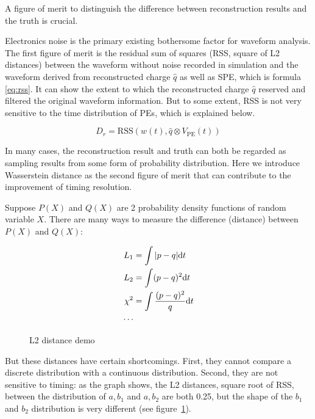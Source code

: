A figure of merit to distinguish the difference between reconstruction results and the truth is crucial. 

Electronics noise is the primary existing bothersome factor for waveform analysis. The first figure of merit is the residual sum of squares (RSS, square of L2 distances) between the waveform without noise recorded in simulation and the waveform derived from reconstructed charge $\hat{q}$ as well as SPE, which is formula \eqref{eq:rss}. It can show the extent to which the reconstructed charge $\hat{q}$ reserved and filtered the original waveform information. But to some extent, RSS is not very sensitive to the time distribution of PEs, which is explained below. 

\begin{equation}
    D_r = \mathrm{RSS}(w(t), \hat{q} \otimes V_\mathrm{PE}(t)) \label{eq:rss}
\end{equation}

In many cases, the reconstruction result and truth can both be regarded as sampling results from some form of probability distribution. Here we introduce Wasserstein distance as the second figure of merit that can contribute to the improvement of timing resolution. 

Suppose $P(X)$ and $Q(X)$ are 2 probability density functions of random variable $X$. There are many ways to measure the difference (distance) between $P(X)$ and $Q(X)$: 

\begin{minipage}{.3\textwidth}
\begin{align*}
    L_{1} &= \int|p-q| \mathrm{d} t \\
    L_{2} &= \int(p-q)^{2} \mathrm{d} t \\
    \chi^{2} &= \int\frac{(p-q)^{2}}{q} \mathrm{d} t \\
    \cdots
\end{align*}
\end{minipage}
\begin{minipage}{.7\textwidth}
\begin{figure}[H]
    \centering
    \scalebox{0.4}{}
    \caption{\label{fig:l2} L2 distance demo}
\end{figure}
\end{minipage}

But these distances have certain shortcomings. First, they cannot compare a discrete distribution with a continuous distribution. Second, they are not sensitive to timing: as the graph shows, the L2 distances, square root of RSS, between the distribution of $a,b_{1}$ and $a,b_{2}$ are both 0.25, but the shape of the $b_{1}$ and $b_{2}$ distribution is very different (see figure~\ref{fig:l2}). 

